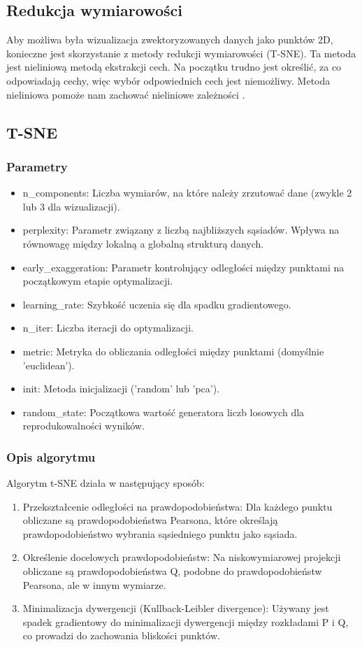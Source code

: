 	\subsection{Redukcja wymiarowości}
		Aby możliwa była wizualizacja zwektoryzowanych danych jako punktów 2D, konieczne jest skorzystanie z metody redukcji wymiarowości (T-SNE). Ta metoda jest nieliniową metodą ekstrakcji cech. Na początku trudno jest określić, za co odpowiadają cechy, więc wybór odpowiednich cech jest niemożliwy. Metoda nieliniowa pomoże nam zachować nieliniowe zależności \cite{t-sne}.
	
		
	\subsection{T-SNE}
	
		\subsubsection{Parametry}
			\begin{itemize}
				\item n\_components: Liczba wymiarów, na które należy zrzutować dane (zwykle 2 lub 3 dla wizualizacji).
				\item perplexity: Parametr związany z liczbą najbliższych sąsiadów. Wpływa na równowagę między lokalną a globalną strukturą danych.
				\item early\_exaggeration: Parametr kontrolujący odległości między punktami na początkowym etapie optymalizacji.
				\item learning\_rate: Szybkość uczenia się dla spadku gradientowego.
				\item n\_iter: Liczba iteracji do optymalizacji.
				\item metric: Metryka do obliczania odległości między punktami (domyślnie 'euclidean').
				\item init: Metoda inicjalizacji ('random' lub 'pca').			
				\item random\_state: Początkowa wartość generatora liczb losowych dla reprodukowalności wyników.
			\end{itemize}				
		
		\subsubsection{Opis algorytmu}
			Algorytm t-SNE działa w następujący sposób: 
			\begin{enumerate}
				\item Przekształcenie odległości na prawdopodobieństwa: Dla każdego punktu obliczane są prawdopodobieństwa Pearsona, które określają prawdopodobieństwo wybrania sąsiedniego punktu jako sąsiada.
				\item Określenie docelowych prawdopodobieństw: Na niskowymiarowej projekcji obliczane są prawdopodobieństwa Q, podobne do prawdopodobieństw Pearsona, ale w innym wymiarze.
				\item Minimalizacja dywergencji (Kullback-Leibler divergence): Używany jest spadek gradientowy do minimalizacji dywergencji między rozkładami P i Q, co prowadzi do zachowania bliskości punktów.
			\end{enumerate}
			
